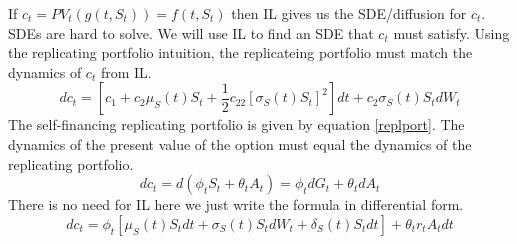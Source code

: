 \documentclass[12pt]{article}
\begin{document}
If $c_t=PV_t(g(t, S_t))=f(t, S_t)$ then IL gives us the SDE/diffusion for
$c_t$. SDEs are hard to solve. We will use IL to find an SDE that $c_t$ must
satisfy. Using the replicating portfolio intuition, the replicateing portfolio
must match the dynamics of $c_t$ from IL.
\begin{equation}
  dc_t=\left[ c_1+c_2\mu_S(t)S_t+\frac{1}{2}c_{22} \left[ \sigma_S(t)S_t
  \right] ^2 \right] dt + c_2\sigma_S(t)S_tdW_t
\end{equation}
The self-financing replicating portfolio is given by equation \ref{replport}.
The dynamics of the present value of the option must equal the dynamics of the
replicating portfolio.
\begin{equation}
  dc_t=d(\phi_t S_t+\theta_t A_t)=\phi_t dG_t + \theta_t dA_t
\end{equation}
There is no need for IL here we just write the formula in differential form.
\begin{equation}
  dc_t=\phi_t \left[ \mu_S(t)S_tdt + \sigma_S(t)S_tdW_t + \delta_S(t)S_tdt
  \right] + \theta_tr_tA_tdt
\end{equation}
\end{document}
